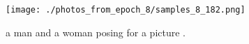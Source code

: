 \documentclass{article}%
\begin{document}
%


\begin{figure}[h!]%
\centering%
\texttt{[image: ./photos\_from\_epoch\_8/samples\_8\_182.png]}%
\caption{a man and a woman posing for a picture .}%
\end{figure}

%
\end{document}
